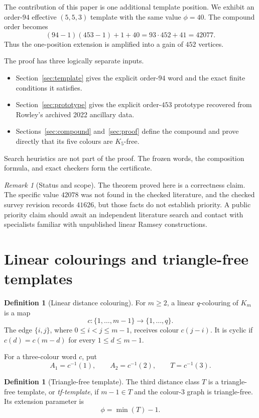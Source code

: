 \documentclass[11pt]{article}
\theoremstyle{definition}
\newtheorem{definition}[theorem]{Definition}
\theoremstyle{remark}
\newtheorem{remark}[theorem]{Remark}
\begin{document}
The contribution of this paper is one additional template position.  We
exhibit an order-$94$ effective $(5,5,3)$ template with the same value
$\phi=40$.  The compound order becomes
\[
  (94-1)(453-1)+1+40
  =93\cdot452+41
  =42077.
\]
Thus the one-position extension is amplified into a gain of $452$ vertices.

The proof has three logically separate inputs.
\begin{itemize}
  \item Section~\ref{sec:template} gives the explicit order-$94$ word and
  the exact finite conditions it satisfies.
  \item Section~\ref{sec:prototype} gives the explicit order-$453$
  prototype recovered from Rowley's archived 2022 ancillary data.
  \item Sections~\ref{sec:compound} and~\ref{sec:proof} define the compound
  and prove directly that its five colours are $K_5$-free.
\end{itemize}
Search heuristics are not part of the proof.  The frozen words, the
composition formula, and exact checkers form the certificate.

\begin{remark}[Status and scope]
The theorem proved here is a correctness claim.  The specific value $42078$
was not found in the checked literature, and the checked survey revision
records $41626$, but those facts do not establish priority.  A public
priority claim should await an independent literature search and contact
with specialists familiar with unpublished linear Ramsey constructions.
\end{remark}

\section{Linear colourings and triangle-free templates}
\label{sec:definitions}

\begin{definition}[Linear distance colouring]
For $m\ge2$, a linear $q$-colouring of $K_m$ is a map
\[
  c:\{1,\ldots,m-1\}\longrightarrow\{1,\ldots,q\}.
\]
The edge $\{i,j\}$, where $0\le i<j\le m-1$, receives colour $c(j-i)$.
It is cyclic if $c(d)=c(m-d)$ for every $1\le d\le m-1$.
\end{definition}

For a three-colour word $c$, put
\[
  A_1=c^{-1}(1),\qquad A_2=c^{-1}(2),\qquad T=c^{-1}(3).
\]

\begin{definition}[Triangle-free template]
The third distance class $T$ is a triangle-free template, or
\emph{tf-template}, if $m-1\in T$ and the colour-$3$ graph is triangle-free.
Its extension parameter is
\[
  \phi=\min(T)-1.
\]
\end{definition}
\end{document}
